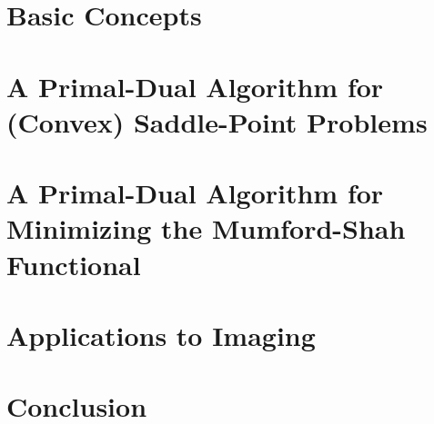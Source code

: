 \documentclass{scrreprt}
\begin{document}





\chapter{Basic Concepts} %
\label{cha:basic_concepts}

    
    
    


\chapter{A Primal-Dual Algorithm for (Convex) Saddle-Point Problems} %
\label{cha:a_first_order_primal_dual_algorithm_for_convex_saddle_point_problems}
    
    
    
    
    
    
    


\chapter{A Primal-Dual Algorithm for Minimizing the Mumford-Shah Functional} %
\label{cha:a_first_order_primal_dual_algorithm_for_minimizing_the_mumford_shah_functional}
    
    
    
    
    


\chapter{Applications to Imaging} %
\label{cha:applications_to_imaging}



\chapter{Conclusion} %
\label{cha:conclusion}





\end{document}
